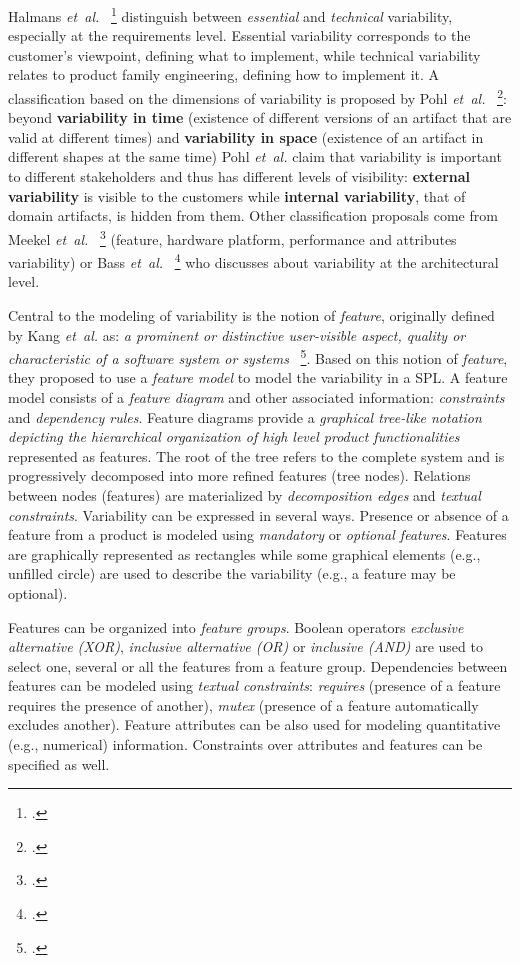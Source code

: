 Halmans \textit{et~al.}~ \footcite{halmans2003} distinguish between \textit{essential} and
\textit{technical} variability, especially at the requirements level. Essential
variability corresponds to the customer's viewpoint, defining what to
implement, while technical variability relates to product family engineering,
defining how to implement it. A classification based on the dimensions of
variability is proposed by Pohl \textit{et~al.}~ \footcite{Pohl2005}: beyond
\textbf{variability in time} (existence of different versions of an artifact
that are valid at different times) and \textbf{variability in space}
(existence of an artifact in different shapes at the same time) Pohl \textit{et~al.} claim that variability is important to different stakeholders and thus has
different levels of visibility: \textbf{external variability} is visible to
the customers while \textbf{internal variability}, that of domain artifacts,
is hidden from them. Other classification proposals come from Meekel \textit{et~al.}~ \footcite{Meekel1998} (feature, hardware platform, performance and attributes
variability) or Bass \textit{et~al.}~ \footcite{BachmannEtAl2001} who discusses about variability
at the architectural level.

Central to the modeling of variability is the notion of \textit{feature},
originally defined by Kang \textit{et~al.} as: \textit{a prominent or distinctive user-visible
aspect, quality or characteristic of a software system or
systems}~ \footcite{Kang1990}. Based on this notion of \textit{feature}, they proposed to use a
\textit{feature model} to model the variability in a SPL. A
feature model consists of a \textit{feature diagram} and other associated
information: \textit{constraints} and \textit{dependency rules}. Feature
diagrams provide a \textit{graphical tree-like notation depicting the
hierarchical organization of high level product functionalities} represented
as features. The root of the tree refers to the complete system and is
progressively decomposed into more refined features (tree nodes). Relations
between nodes (features) are materialized by \textit{decomposition edges} and
\textit{textual constraints}. Variability can be expressed in several
ways. Presence or absence of a feature from a product is modeled using
\textit{mandatory} or \textit{optional features}. Features are graphically
represented as rectangles while some graphical elements (e.g., unfilled
circle) are used to describe the variability (e.g., a feature may be
optional).

Features can be organized into \textit{feature groups}. Boolean operators
\textit{exclusive alternative (XOR)}, \textit{inclusive alternative (OR)} or
\textit{inclusive (AND)} are used to select one, several or all the features
from a feature group. Dependencies between features can be modeled using
\textit{textual constraints}: \textit{requires} (presence of a feature requires
the presence of another), \textit{mutex} (presence of a feature automatically
excludes another). Feature attributes can be also used for modeling quantitative (e.g., numerical) information. 
Constraints over attributes and features can be specified as well. 

